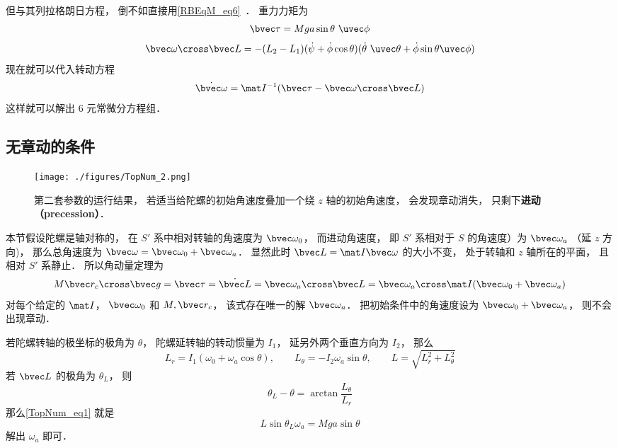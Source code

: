 但与其列拉格朗日方程， 倒不如直接用\autoref{RBEqM_eq6}~． 重力力矩为
\begin{equation}
\bvec\tau = Mga\sin\theta\ \uvec\phi
\end{equation}
\begin{equation}
\bvec\omega\cross\bvec L = -(L_2-L_1)(\dot\psi + \dot\phi\cos\theta)(\dot\theta\ \uvec\theta  + \dot\phi\sin\theta\uvec\phi)
\end{equation}
现在就可以代入转动方程
\begin{equation}
\dot{\bvec\omega} = \mat I^{-1}(\bvec\tau - \bvec\omega\cross\bvec L)
\end{equation}
这样就可以解出 6 元常微分方程组．

\subsection{无章动的条件}

\begin{figure}[ht]
\centering
\texttt{[image: ./figures/TopNum\_2.png]}
\caption{第二套参数的运行结果， 若适当给陀螺的初始角速度叠加一个绕 $z$ 轴的初始角速度， 会发现章动消失， 只剩下\textbf{进动（precession）}．} \label{TopNum_fig2}
\end{figure}

本节假设陀螺是轴对称的， 在 $S'$ 系中相对转轴的角速度为 $\bvec\omega_0$， 而进动角速度， 即 $S'$ 系相对于 $S$ 的角速度）为 $\bvec\omega_a$ （延 $z$ 方向)， 那么总角速度为 $\bvec\omega = \bvec\omega_0 + \bvec\omega_a$． 显然此时 $\bvec L = \mat I \bvec\omega$ 的大小不变， 处于转轴和 $z$ 轴所在的平面， 且相对 $S'$ 系静止． 所以角动量定理为
\begin{equation}\label{TopNum_eq1}
M\bvec r_c\cross \bvec g = \bvec\tau = \dot{\bvec L} = \bvec\omega_a\cross\bvec L = \bvec\omega_a\cross \mat I (\bvec\omega_0 + \bvec\omega_a)
\end{equation}
对每个给定的 $\mat I$， $\bvec\omega_0$ 和 $M, \bvec r_c$， 该式存在唯一的解 $\bvec\omega_a$． 把初始条件中的角速度设为 $\bvec\omega_0 + \bvec\omega_a$， 则不会出现章动．

若陀螺转轴的极坐标的极角为 $\theta$， 陀螺延转轴的转动惯量为 $I_1$， 延另外两个垂直方向为 $I_2$， 那么
\begin{equation}
L_r = I_1(\omega_0+\omega_a\cos\theta), \qquad
L_\theta = -I_2\omega_a\sin\theta, \qquad
L = \sqrt{L_r^2 + L_\theta^2}
\end{equation}
若 $\bvec L$ 的极角为 $\theta_L$， 则
\begin{equation}
\theta_L - \theta = \arctan\frac{L_\theta}{L_r}
\end{equation}
那么\autoref{TopNum_eq1} 就是
\begin{equation}
L\sin\theta_L \omega_a = Mga\sin\theta
\end{equation}
解出 $\omega_a$ 即可．


